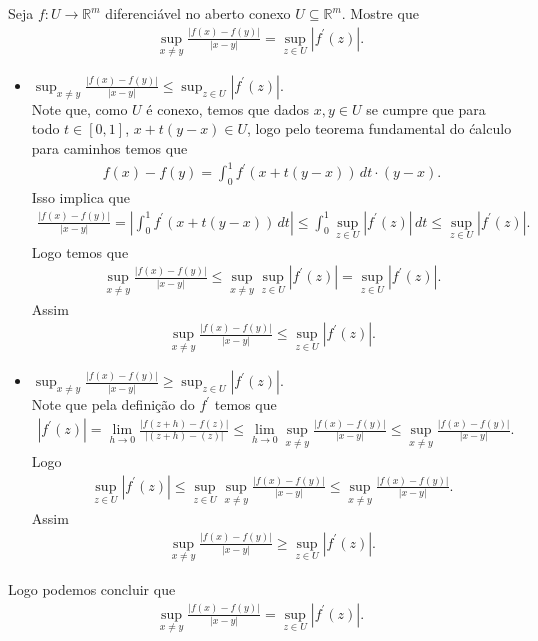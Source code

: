 \begin{homeworkProblem}[Seção 3-5]
  Seja $f:U\to\mathbb{R}^{m}$ diferenciável no aberto conexo $U\subseteq \mathbb{R}^{m}$. Mostre que
  \begin{align*}
    \sup_{x\neq y}\frac{|f(x)-f(y)|}{|x-y|}=\sup_{z\in U}|f^{\prime}(z)|.
  \end{align*}
  \begin{solution}
    \begin{itemize}
      \item $\displaystyle \sup_{x\neq y}\frac{|f(x)-f(y)|}{|x-y|}\leq \sup_{z\in U}|f^{\prime}(z)|$.\\
        Note que, como $U$ é conexo, temos que dados $x,y\in U$ se cumpre que para todo $t\in[0,1]$, $x+t(y-x)\in U$, logo pelo teorema fundamental do ćalculo para caminhos temos que
        \begin{align*}
          f(x)-f(y)=\int_{0}^{1}f^{\prime}(x+t(y-x))\,dt\cdot (y-x).
        \end{align*}
        Isso implica que
        \begin{align*}
          \frac{|f(x)-f(y)|}{|x-y|}=\left| \int_{0}^{1}f^{\prime}(x+t(y-x))\,dt \right|\leq \int_{0}^{1}\sup_{z\in U}|f^{\prime}(z)|\,dt\leq \sup_{z\in U}|f^{\prime}(z)|.
        \end{align*}
        Logo temos que
        \begin{align*}
          \sup_{x\neq y}\frac{|f(x)-f(y)|}{|x-y|}\leq \sup_{x\neq y}\sup_{z\in U}|f^{\prime}(z)|=\sup_{z\in U}|f^{\prime}(z)|.
        \end{align*}
        Assim
        \begin{align*}
          \sup_{x\neq y}\frac{|f(x)-f(y)|}{|x-y|}\leq \sup_{z\in U}|f^{\prime}(z)|. 
        \end{align*}
      \item $\displaystyle \sup_{x\neq y}\frac{|f(x)-f(y)|}{|x-y|}\geq \sup_{z\in U}|f^{\prime}(z)|$.\\
        Note que pela definição do $f^{\prime}$ temos que
        \begin{align*}
          |f^{\prime}(z)|=\lim_{h \to 0}\frac{|f(z+h)-f(z)|}{|(z+h)-(z)|}\leq \lim_{h \to 0}\sup_{x\neq y}\frac{|f(x)-f(y)|}{|x-y|}\leq \sup_{x\neq y}\frac{|f(x)-f(y)|}{|x-y|}.
        \end{align*}
        Logo
        \begin{align*}
          \sup_{z\in U}|f^{\prime}(z)|\leq \sup_{z\in U}\sup_{x\neq y}\frac{|f(x)-f(y)|}{|x-y|}\leq \sup_{x\neq y}\frac{|f(x)-f(y)|}{|x-y|}.
        \end{align*}
        Assim
        \begin{align*}
          \sup_{x\neq y}\frac{|f(x)-f(y)|}{|x-y|}\geq \sup_{z\in U}|f^{\prime}(z)|. 
        \end{align*}
    \end{itemize}
    Logo podemos concluir que
    \begin{align*}
      \sup_{x\neq y}\frac{|f(x)-f(y)|}{|x-y|}=\sup_{z\in U}|f^{\prime}(z)|.
    \end{align*}
  \end{solution}
\end{homeworkProblem}
